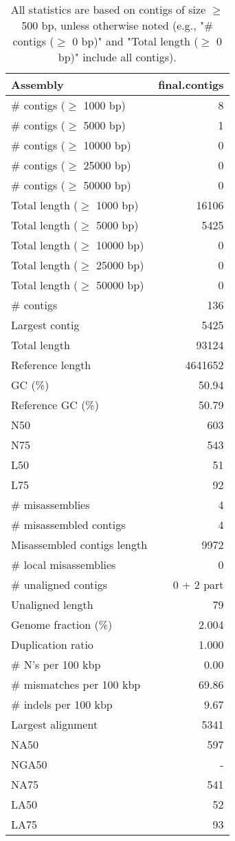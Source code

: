 \documentclass[12pt,a4paper]{article}
\begin{document}
\begin{table}[ht]
\begin{center}
\caption{All statistics are based on contigs of size $\geq$ 500 bp, unless otherwise noted (e.g., "\# contigs ($\geq$ 0 bp)" and "Total length ($\geq$ 0 bp)" include all contigs).}
\begin{tabular}{|l*{1}{|r}|}
\hline
Assembly & final.contigs \\ \hline
\# contigs ($\geq$ 1000 bp) & 8 \\ \hline
\# contigs ($\geq$ 5000 bp) & 1 \\ \hline
\# contigs ($\geq$ 10000 bp) & 0 \\ \hline
\# contigs ($\geq$ 25000 bp) & 0 \\ \hline
\# contigs ($\geq$ 50000 bp) & 0 \\ \hline
Total length ($\geq$ 1000 bp) & 16106 \\ \hline
Total length ($\geq$ 5000 bp) & 5425 \\ \hline
Total length ($\geq$ 10000 bp) & 0 \\ \hline
Total length ($\geq$ 25000 bp) & 0 \\ \hline
Total length ($\geq$ 50000 bp) & 0 \\ \hline
\# contigs & 136 \\ \hline
Largest contig & 5425 \\ \hline
Total length & 93124 \\ \hline
Reference length & 4641652 \\ \hline
GC (\%) & 50.94 \\ \hline
Reference GC (\%) & 50.79 \\ \hline
N50 & 603 \\ \hline
N75 & 543 \\ \hline
L50 & 51 \\ \hline
L75 & 92 \\ \hline
\# misassemblies & 4 \\ \hline
\# misassembled contigs & 4 \\ \hline
Misassembled contigs length & 9972 \\ \hline
\# local misassemblies & 0 \\ \hline
\# unaligned contigs & 0 + 2 part \\ \hline
Unaligned length & 79 \\ \hline
Genome fraction (\%) & 2.004 \\ \hline
Duplication ratio & 1.000 \\ \hline
\# N's per 100 kbp & 0.00 \\ \hline
\# mismatches per 100 kbp & 69.86 \\ \hline
\# indels per 100 kbp & 9.67 \\ \hline
Largest alignment & 5341 \\ \hline
NA50 & 597 \\ \hline
NGA50 & - \\ \hline
NA75 & 541 \\ \hline
LA50 & 52 \\ \hline
LA75 & 93 \\ \hline
\end{tabular}
\end{center}
\end{table}
\end{document}
